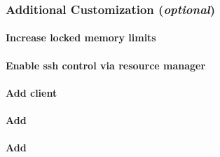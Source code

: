 \documentclass[letterpaper]{article}
\begin{document}


\subsubsection{Additional Customization ({\em optional})} \label{sec:addl_customizations}


\paragraph{Increase locked memory limits}


\paragraph{Enable ssh control via resource manager}


\paragraph{Add \Lustre{} client} \label{sec:lustre_client}




\vspace*{0.4cm}

\paragraph{Add \clustershell{}}


\paragraph{Add \genders{}}

\end{document}
